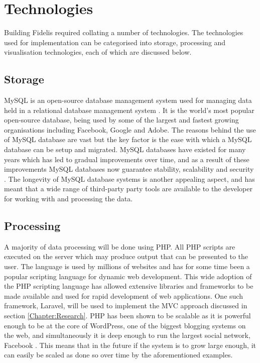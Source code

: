\section{Technologies}
Building Fidelis required collating a number of technologies. The technologies used for implementation can be categorised into storage, processing and visualisation technologies, each of which are discussed below.

\subsection{Storage}
MySQL is an open-source database management system used for managing data held in a relational database management system \cite{MySQL:Home}. It is the world's most popular open-source database, being used by some of the largest and fastest growing organisations including Facebook, Google and Adobe. The reasons behind the use of MySQL database are vast but the key factor is the ease with which a MySQL database can be setup and migrated. MySQL databases have existed for many years which has led to gradual improvements over time, and as a result of these improvements MySQL databases now guarantee stability, scalability and security \cite{MySQL:Why}. The longevity of MySQL database systems is another appealing aspect, and has meant that a wide range of third-party party tools are available to the developer for working with and processing the data. 

\subsection{Processing}
A majority of data processing will be done using PHP. All PHP scripts are executed on the server which may produce output that can be presented to the user. The language is used by millions of websites and has for some time been  a popular scripting language for dynamic web development. This wide adoption of the PHP scripting language has allowed extensive libraries and frameworks to be made available and used for rapid development of web applications. One such framework, Laravel, will be used to implement the MVC approach discussed in section \ref{Chapter:Research}. PHP has been shown to be scalable as it is powerful enough to be at the core of WordPress, one of the biggest blogging systems on the web, and simultaneously it is deep enough to run the largest social network, Facebook \cite{W3Schools:PHP_Intro, Wiki:WordPress, Fastcompany:Facebook_PHP}. This means that in the future if the system is to grow large enough, it can easily be scaled as done so over time by the aforementioned examples. 


